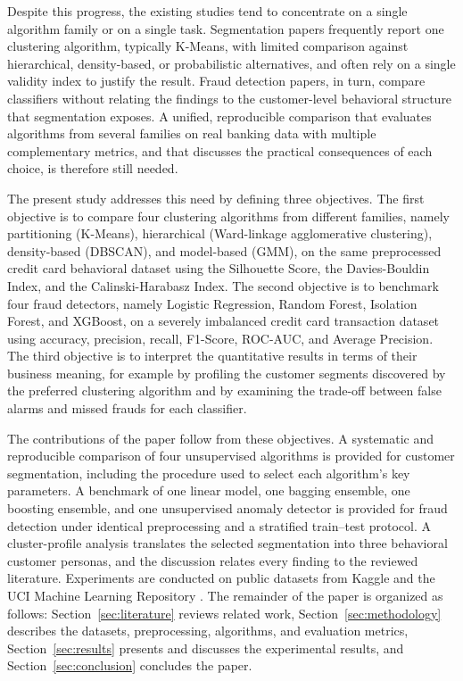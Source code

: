 \documentclass[conference]{IEEEtran}
\begin{document}
Despite this progress, the existing studies tend to concentrate on a single algorithm family or on a single task. Segmentation papers frequently report one clustering algorithm, typically K-Means, with limited comparison against hierarchical, density-based, or probabilistic alternatives, and often rely on a single validity index to justify the result. Fraud detection papers, in turn, compare classifiers without relating the findings to the customer-level behavioral structure that segmentation exposes. A unified, reproducible comparison that evaluates algorithms from several families on real banking data with multiple complementary metrics, and that discusses the practical consequences of each choice, is therefore still needed.

The present study addresses this need by defining three objectives. The first objective is to compare four clustering algorithms from different families, namely partitioning (K-Means), hierarchical (Ward-linkage agglomerative clustering), density-based (DBSCAN), and model-based (GMM), on the same preprocessed credit card behavioral dataset using the Silhouette Score, the Davies-Bouldin Index, and the Calinski-Harabasz Index. The second objective is to benchmark four fraud detectors, namely Logistic Regression, Random Forest, Isolation Forest, and XGBoost, on a severely imbalanced credit card transaction dataset using accuracy, precision, recall, F1-Score, ROC-AUC, and Average Precision. The third objective is to interpret the quantitative results in terms of their business meaning, for example by profiling the customer segments discovered by the preferred clustering algorithm and by examining the trade-off between false alarms and missed frauds for each classifier.

The contributions of the paper follow from these objectives. A systematic and reproducible comparison of four unsupervised algorithms is provided for customer segmentation, including the procedure used to select each algorithm's key parameters. A benchmark of one linear model, one bagging ensemble, one boosting ensemble, and one unsupervised anomaly detector is provided for fraud detection under identical preprocessing and a stratified train--test protocol. A cluster-profile analysis translates the selected segmentation into three behavioral customer personas, and the discussion relates every finding to the reviewed literature. Experiments are conducted on public datasets from Kaggle and the UCI Machine Learning Repository \cite{kaggle_ccgeneral,kaggle_fraud,uci_default}. The remainder of the paper is organized as follows: Section~\ref{sec:literature} reviews related work, Section~\ref{sec:methodology} describes the datasets, preprocessing, algorithms, and evaluation metrics, Section~\ref{sec:results} presents and discusses the experimental results, and Section~\ref{sec:conclusion} concludes the paper.
\end{document}

